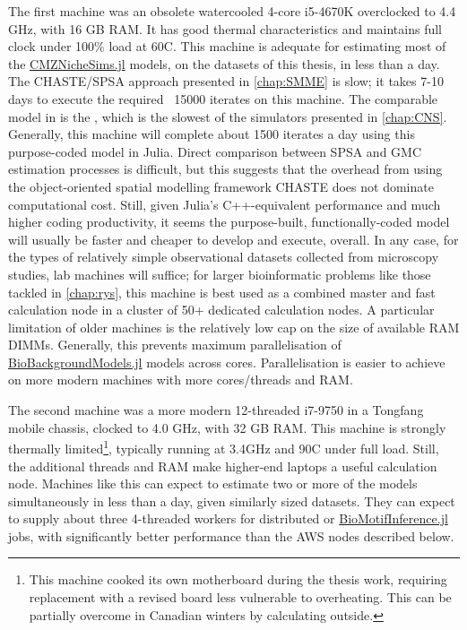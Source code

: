 \documentclass{ut-thesis}
\begin{document}
\begin{NoHyper}
The first machine was an obsolete watercooled 4-core i5-4670K overclocked to 4.4 GHz, with 16 GB RAM. It has good thermal characteristics and maintains full clock under 100\% load at 60\textdegree C. This machine is adequate for estimating most of the \hyperref[chap:CNS]{CMZNicheSims.jl} models, on the datasets of this thesis, in less than a day. The CHASTE/SPSA approach presented in \autoref{chap:SMME} is slow; it takes 7-10 days to execute the required ~15000 iterates on this machine. The comparable model in  is the , which is the slowest of the simulators presented in \autoref{chap:CNS}. Generally, this machine will complete about 1500 iterates a day using this purpose-coded model in Julia. Direct comparison between SPSA and GMC estimation processes is difficult, but this suggests that the overhead from using the object-oriented spatial modelling framework CHASTE does not dominate computational cost. Still, given Julia's C++-equivalent performance and much higher coding productivity, it seems the purpose-built, functionally-coded model will usually be faster and cheaper to develop and execute, overall. In any case, for the types of relatively simple observational datasets collected from microscopy studies, lab machines will suffice; for larger bioinformatic problems like those tackled in \autoref{chap:rys}, this machine is best used as a combined master and fast calculation node in a cluster of 50+ dedicated calculation nodes. A particular limitation of older machines is the relatively low cap on the size of available RAM DIMMs. Generally, this prevents maximum parallelisation of \hyperref[chap:BBM]{BioBackgroundModels.jl} models across cores. Parallelisation is easier to achieve on more modern machines with more cores/threads and RAM. 

The second machine was a more modern 12-threaded i7-9750 in a Tongfang mobile chassis, clocked to 4.0 GHz, with 32 GB RAM. This machine is strongly thermally limited\footnote{This machine cooked its own motherboard during the thesis work, requiring replacement with a revised board less vulnerable to overheating. This can be partially overcome in Canadian winters by calculating outside.}, typically running at 3.4GHz and 90\textdegree C under full load. Still, the additional threads and RAM make higher-end laptops a useful calculation node. Machines like this can expect to estimate two or more of the  models simultaneously in less than a day, given similarly sized datasets. They can expect to supply about three 4-threaded workers for distributed  or \hyperref[chap:BBM]{BioMotifInference.jl} jobs, with significantly better performance than the AWS nodes described below.


\end{NoHyper}
\end{document}
